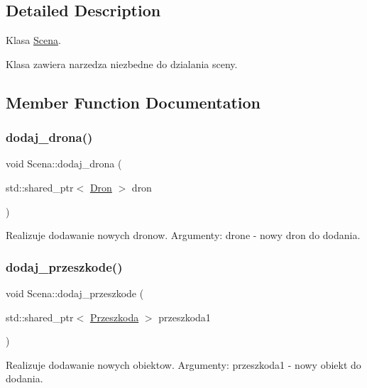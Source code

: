 \subsection{Detailed Description}
Klasa \mbox{\hyperlink{class_scena}{Scena}}. 

Klasa zawiera narzedza niezbedne do dzialania sceny. 

\subsection{Member Function Documentation}
\mbox{\label{class_scena_a22103722367c966c09d29ecf32c047ce}} 
\subsubsection{\texorpdfstring{dodaj\_drona()}{dodaj\_drona()}}
{\footnotesize\ttfamily void Scena\+::dodaj\+\_\+drona (\begin{DoxyParamCaption}\item[{std\+::shared\+\_\+ptr$<$ \mbox{\hyperlink{class_dron}{Dron}} $>$}]{dron }\end{DoxyParamCaption})\hspace{0.3cm}{\ttfamily [inline]}}

Realizuje dodawanie nowych dronow. Argumenty\+: drone -\/ nowy dron do dodania. \mbox{\label{class_scena_adaa6deabe2da0a2303100eb10ee1a44c}} 
\subsubsection{\texorpdfstring{dodaj\_przeszkode()}{dodaj\_przeszkode()}}
{\footnotesize\ttfamily void Scena\+::dodaj\+\_\+przeszkode (\begin{DoxyParamCaption}\item[{std\+::shared\+\_\+ptr$<$ \mbox{\hyperlink{class_przeszkoda}{Przeszkoda}} $>$}]{przeszkoda1 }\end{DoxyParamCaption})\hspace{0.3cm}{\ttfamily [inline]}}

Realizuje dodawanie nowych obiektow. Argumenty\+: przeszkoda1 -\/ nowy obiekt do dodania. \mbox{\label{class_scena_a6d75136075e1d0c562e77b8548b3e621}} 
